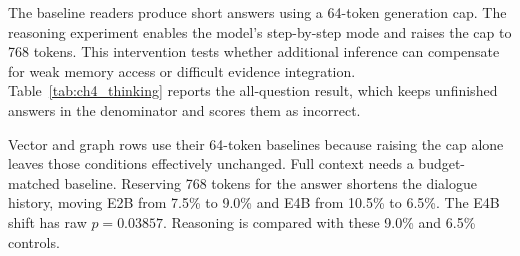 The baseline readers produce short answers using a 64-token generation cap. The reasoning
experiment enables the model's step-by-step mode and raises the cap to 768 tokens. This intervention
tests whether additional inference can compensate for weak memory access or difficult evidence
integration. Table~\ref{tab:ch4_thinking} reports the all-question result, which keeps unfinished
answers in the denominator and scores them as incorrect.

Vector and graph rows use their 64-token baselines because raising the cap alone leaves those
conditions effectively unchanged. Full context needs a budget-matched baseline. Reserving 768 tokens
for the answer shortens the dialogue history, moving E2B from 7.5\% to 9.0\% and E4B from 10.5\% to
6.5\%. The E4B shift has raw $p=0.03857$. Reasoning is compared with these 9.0\% and 6.5\%
controls.

\begin{table}[htbp]
  \centering
  \scriptsize
  \setlength{\tabcolsep}{3.5pt}
  \caption{Accuracy with reasoning disabled and enabled. ``Truncated'' is the proportion of
           reasoning runs that exhausted the 768-token generation budget without producing a
           parseable final answer. Mean tokens counts completion tokens in the reasoning run. The
           full-context rows use the budget-matched controls described in the text.}
  \label{tab:ch4_thinking}
\end{table}


